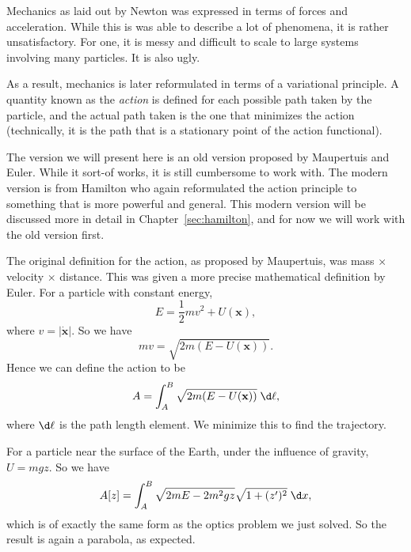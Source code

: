 \documentclass[a4paper]{article}
\begin{document}
\begin{eg}
  Mechanics as laid out by Newton was expressed in terms of forces and acceleration. While this is was able to describe a lot of phenomena, it is rather unsatisfactory. For one, it is messy and difficult to scale to large systems involving many particles. It is also ugly.

  As a result, mechanics is later reformulated in terms of a variational principle. A quantity known as the \emph{action} is defined for each possible path taken by the particle, and the actual path taken is the one that minimizes the action (technically, it is the path that is a stationary point of the action functional).

  The version we will present here is an old version proposed by Maupertuis and Euler. While it sort-of works, it is still cumbersome to work with. The modern version is from Hamilton who again reformulated the action principle to something that is more powerful and general. This modern version will be discussed more in detail in Chapter~\ref{sec:hamilton}, and for now we will work with the old version first.

  The original definition for the action, as proposed by Maupertuis, was mass $\times$ velocity $\times$ distance. This was given a more precise mathematical definition by Euler. For a particle with constant energy,
  \[
    E = \frac{1}{2} mv^2 + U(\mathbf{x}),
  \]
  where $v = |\dot{\mathbf{x}}|$. So we have
  \[
    mv = \sqrt{2m(E - U(\mathbf{x}))}.
  \]
  Hence we can define the action to be
  \[
    A = \int_A^B \sqrt{2m(E - U(\mathbf{x}))}\;\d \ell,
  \]
  where $\d\ell$ is the path length element. We minimize this to find the trajectory.

  For a particle near the surface of the Earth, under the influence of gravity, $U = mgz$. So we have
  \[
    A[z] = \int_A^B \sqrt{2mE - 2m^2gz}\sqrt{1 + (z')^2}\;\d x,
  \]
  which is of exactly the same form as the optics problem we just solved. So the result is again a parabola, as expected.
\end{eg}
\end{document}
